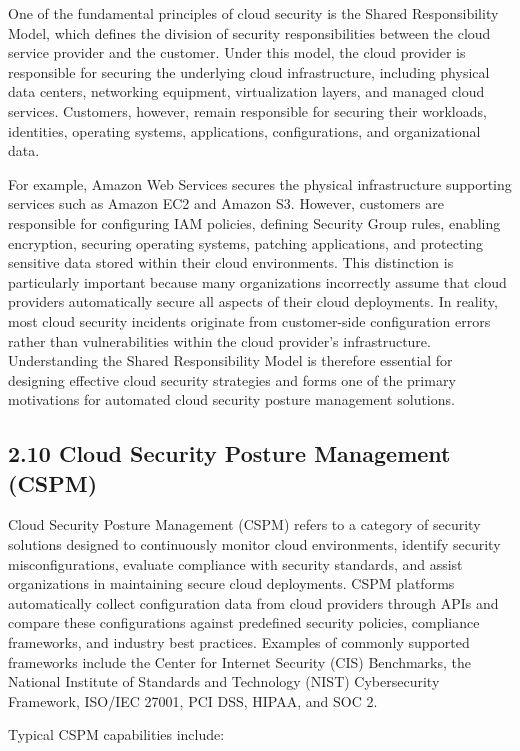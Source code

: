 One of the fundamental principles of cloud security is the Shared Responsibility Model, which defines the division of security responsibilities between the cloud service provider and the customer. Under this model, the cloud provider is responsible for securing the underlying cloud infrastructure, including physical data centers, networking equipment, virtualization layers, and managed cloud services. Customers, however, remain responsible for securing their workloads, identities, operating systems, applications, configurations, and organizational data.

For example, Amazon Web Services secures the physical infrastructure supporting services such as Amazon EC2 and Amazon S3. However, customers are responsible for configuring IAM policies, defining Security Group rules, enabling encryption, securing operating systems, patching applications, and protecting sensitive data stored within their cloud environments. This distinction is particularly important because many organizations incorrectly assume that cloud providers automatically secure all aspects of their cloud deployments. In reality, most cloud security incidents originate from customer-side configuration errors rather than vulnerabilities within the cloud provider's infrastructure. Understanding the Shared Responsibility Model is therefore essential for designing effective cloud security strategies and forms one of the primary motivations for automated cloud security posture management solutions.

\subsection{2.10 Cloud Security Posture Management (CSPM)}

Cloud Security Posture Management (CSPM) refers to a category of security solutions designed to continuously monitor cloud environments, identify security misconfigurations, evaluate compliance with security standards, and assist organizations in maintaining secure cloud deployments. CSPM platforms automatically collect configuration data from cloud providers through APIs and compare these configurations against predefined security policies, compliance frameworks, and industry best practices. Examples of commonly supported frameworks include the Center for Internet Security (CIS) Benchmarks, the National Institute of Standards and Technology (NIST) Cybersecurity Framework, ISO/IEC 27001, PCI DSS, HIPAA, and SOC 2.

Typical CSPM capabilities include:

